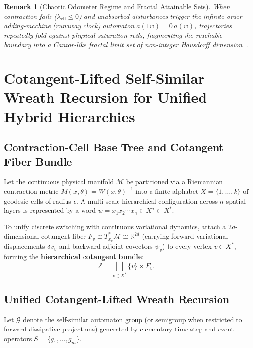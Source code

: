 \documentclass[journal]{IEEEtran}
\newtheorem{remark}{Remark}
\begin{document}
\begin{remark}[Chaotic Odometer Regime and Fractal Attainable Sets]
When contraction fails ($\lambda_{\text{eff}} \le 0$) and unabsorbed disturbances trigger the infinite-order adding-machine (runaway clock) automaton $a(1w) = 0\,a(w)$, trajectories repeatedly fold against physical saturation rails, fragmenting the reachable boundary into a Cantor-like fractal limit set of non-integer Hausdorff dimension~\cite{nekrashevych05}.
\end{remark}



\section{Cotangent-Lifted Self-Similar Wreath Recursion for Unified Hybrid Hierarchies}

\subsection{Contraction-Cell Base Tree and Cotangent Fiber Bundle}
Let the continuous physical manifold $\mathcal{M}$ be partitioned via a Riemannian contraction metric $M(x, \theta) = W(x, \theta)^{-1}$ into a finite alphabet $X = \{1, \dots, k\}$ of geodesic cells of radius $\epsilon$. A multi-scale hierarchical configuration across $n$ spatial layers is represented by a word $w = x_1 x_2 \cdots x_n \in X^n \subset X^*$.

To unify discrete switching with continuous variational dynamics, attach a $2d$-dimensional cotangent fiber $F_v \cong T^*_{x_v}\mathcal{M} \cong \mathbb{R}^{2d}$ (carrying forward variational displacements $\delta x_v$ and backward adjoint covectors $\psi_v$) to every vertex $v \in X^*$, forming the \textbf{hierarchical cotangent bundle}:
\begin{equation}
\mathcal{E} = \bigsqcup_{v \in X^*} \{v\} \times F_v.
\end{equation}

\subsection{Unified Cotangent-Lifted Wreath Recursion}
Let $\mathcal{G}$ denote the self-similar automaton group (or semigroup when restricted to forward dissipative projections) generated by elementary time-step and event operators $S = \{g_1, \dots, g_m\}$.
\end{document}
